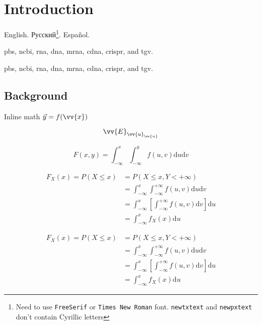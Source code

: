 \chapter{Introduction}
\label{ch1:Introduction}

English. \foreignlanguage{russian}{Русский}\footnote{Need to use \verb|FreeSerif| or \verb|Times New Roman| font. \verb|newtxtext| and \verb|newpxtext| don't contain Cyrillic letters}. \foreignlanguage{spanish}{Español}.

\Gls{pbs}, \gls{ncbi}, \gls{rna}, \gls{dna}, \gls{mrna}, \gls{cdna}, \gls{crispr}, and \gls{tgv}.

\Gls{pbs}, \gls{ncbi}, \gls{rna}, \gls{dna}, \gls{mrna}, \gls{cdna}, \gls{crispr}, and \gls{tgv}.

\section{Background}
\label{ch1:sec:Background}

Inline math $\Vec{y}=f(\vv{x})$

\begin{equation}
    \vv{E}_{\vv{u}_{\vv{u}}}
\end{equation}

\begin{equation}\label{eq:joint_probability_distribution_function}
  F\left( x,y \right) =\int_{-\infty}^x{\int_{-\infty}^y{f\left( u,v \right) \text{d}u\text{d}v}}
\end{equation}

\begin{align}\label{eq:myalign}
  F_X\left( x \right) =P\left( X\leqslant x \right) & =P\left( X\leqslant x,Y<+\infty \right) \\
                                                    & =\int_{-\infty}^x{\int_{-\infty}^{+\infty}{f\left( u,v \right) \text{d}u\text{d}v}} \\
                                                    & =\int_{-\infty}^x{\left[ \int_{-\infty}^{+\infty}{f\left( u,v \right) \text{d}v} \right] \text{d}u}\\
                                                    & =\int_{-\infty}^x{f_X\left( x \right) \text{d}u}
\end{align}

\begin{equation}\label{eq:myeq}
  \begin{split}
  F_X\left( x \right) =P\left( X\leqslant x \right) & =P\left( X\leqslant x,Y<+\infty \right) \\
                                                    & =\int_{-\infty}^x{\int_{-\infty}^{+\infty}{f\left( u,v \right) \text{d}u\text{d}v}} \\
                                                    & =\int_{-\infty}^x{\left[ \int_{-\infty}^{+\infty}{f\left( u,v \right) \text{d}v} \right] \text{d}u}\\
                                                    & =\int_{-\infty}^x{f_X\left( x \right) \text{d}u}
  \end{split}
\end{equation}

